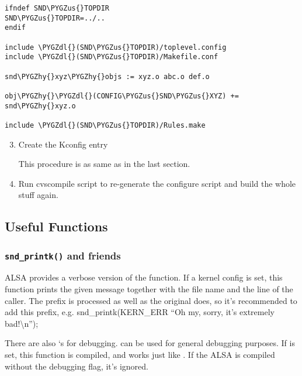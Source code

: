 \documentclass[a4paper,8pt,english]{sphinxmanual}
\def\PYGZus{\char`\_}
\def\PYGZdl{\char`\$}
\def\PYGZhy{\char`\-}
\begin{document}
\begin{Verbatim}[commandchars=\\\{\}]
ifndef SND\PYGZus{}TOPDIR
SND\PYGZus{}TOPDIR=../..
endif

include \PYGZdl{}(SND\PYGZus{}TOPDIR)/toplevel.config
include \PYGZdl{}(SND\PYGZus{}TOPDIR)/Makefile.conf

snd\PYGZhy{}xyz\PYGZhy{}objs := xyz.o abc.o def.o

obj\PYGZhy{}\PYGZdl{}(CONFIG\PYGZus{}SND\PYGZus{}XYZ) += snd\PYGZhy{}xyz.o

include \PYGZdl{}(SND\PYGZus{}TOPDIR)/Rules.make
\end{Verbatim}
\begin{enumerate}
\setcounter{enumi}{2}
\item {} 
Create the Kconfig entry

This procedure is as same as in the last section.

\item {} 
Run cvscompile script to re-generate the configure script and build
the whole stuff again.

\end{enumerate}


\subsection{Useful Functions}
\label{sound/kernel-api/writing-an-alsa-driver:useful-functions}

\subsubsection{\texttt{snd\_printk()} and friends}
\label{sound/kernel-api/writing-an-alsa-driver:snd-printk-and-friends}
ALSA provides a verbose version of the  function.
If a kernel config  is set, this function
prints the given message together with the file name and the line of the
caller. The  prefix is processed as well as the original
 does, so it's recommended to add this prefix,
e.g. snd\_printk(KERN\_ERR ``Oh my, sorry, it's extremely bad!\textbackslash{}n'');

There are also `s for debugging.
 can be used for general debugging purposes.
If  is set, this function is compiled, and works
just like . If the ALSA is compiled without
the debugging flag, it's ignored.
\end{document}

